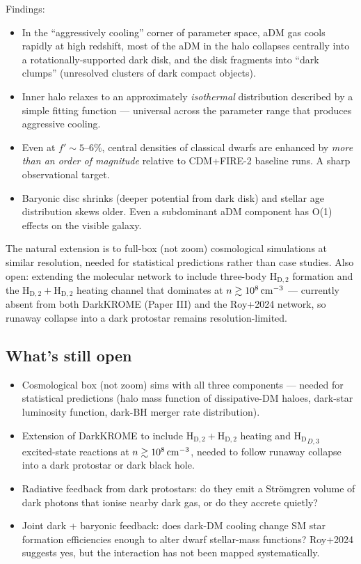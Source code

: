 \documentclass[12pt]{article}
\newcommand{\HD}{\mathrm{H_D}}
\newcommand{\HDtwo}{\mathrm{H_{D,2}}}
\begin{document}
%
Findings:
%
\begin{itemize}
  \item In the ``aggressively cooling'' corner of parameter space,
        aDM gas cools rapidly at high redshift, most of the aDM in
        the halo collapses centrally into a rotationally-supported
        dark disk, and the disk fragments into ``dark clumps''
        (unresolved clusters of dark compact objects).
  \item Inner halo relaxes to an approximately \emph{isothermal}
        distribution described by a simple fitting function ---
        universal across the parameter range that produces aggressive
        cooling.
  \item Even at $f'\sim 5$--$6\%$, central densities of classical
        dwarfs are enhanced by \emph{more than an order of magnitude}
        relative to CDM+FIRE-2 baseline runs.  A sharp observational
        target.
  \item Baryonic disc shrinks (deeper potential from dark disk) and
        stellar age distribution skews older.  Even a subdominant
        aDM component has O(1) effects on the visible galaxy.
\end{itemize}
%
The natural extension is to full-box (not zoom) cosmological
simulations at similar resolution, needed for statistical
predictions rather than case studies.  Also open: extending the
molecular network to include three-body $\HDtwo$ formation and the
$\HDtwo + \HDtwo$ heating channel that dominates at
$n\gtrsim 10^8\,{\rm cm^{-3}}$ --- currently absent from both
DarkKROME (Paper III) and the Roy+2024 network, so runaway collapse
into a dark protostar remains resolution-limited.

\subsection{What's still open}
\label{sec:open}

\begin{itemize}
  \item Cosmological box (not zoom) sims with all three components ---
        needed for statistical predictions (halo mass function of
        dissipative-DM haloes, dark-star luminosity function, dark-BH
        merger rate distribution).
  \item Extension of DarkKROME to include $\HDtwo + \HDtwo$ heating and
        $\HD_{D,3}$ excited-state reactions at
        $n\gtrsim 10^8\,{\rm cm^{-3}}$, needed to follow
        runaway collapse into a dark protostar or dark black hole.
  \item Radiative feedback from dark protostars: do they emit a
        Str\"omgren volume of dark photons that ionise nearby
        dark gas, or do they accrete quietly?
  \item Joint dark + baryonic feedback: does dark-DM cooling
        change SM star formation efficiencies enough to alter dwarf
        stellar-mass functions?  Roy+2024 suggests yes, but the
        interaction has not been mapped systematically.
\end{itemize}
\end{document}

